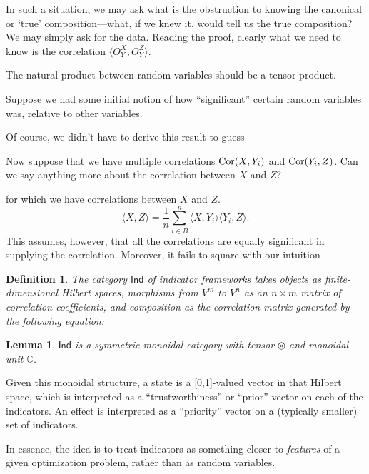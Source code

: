 \documentclass{sig-alternate-05-2015}
\theoremstyle{plain}
\newtheorem{lem}[thm]{Lemma}
\theoremstyle{plain}
\newtheorem{define}{Definition}
\theoremstyle{remark}
\newcommand{\Cat}[1]{\mathsf{#1}}
\def\Ind{\Cat{Ind}}
\def\Cor{\textnormal{Cor}}
\begin{document}
In such a situation, we may ask what is the obstruction to knowing the canonical or `true' composition---what, if we knew it, would tell us the true composition? We may simply ask for the data. Reading the proof, clearly what we need to know is the correlation $\langle O_Y^X, O_Y^Z \rangle$.

The natural product between random variables should be a tensor product.

Suppose we had some initial notion of how ``significant'' certain random variables was, relative to other variables.


Of course, we didn't have to derive this result to guess 

Now suppose that we have multiple correlations $\Cor(X,Y_i)$ and $\Cor(Y_i,Z)$. Can we say anything more about the correlation between $X$ and $Z$?

 for which we have correlations between $X$ and $Z$.
\[ \langle X , Z \rangle = \frac{1}{n} \sum_{i \in B}^n \langle X,Y_i \rangle \langle Y_i, Z \rangle.\] 
This assumes, however, that all the correlations are equally significant in supplying the correlation. Moreover, it fails to square with our intuition

\begin{define}The category $\Ind$ of indicator frameworks takes objects as finite-dimensional Hilbert spaces, morphisms from $V^m$ to $V^n$ as an $n \times m$ matrix of correlation coefficients, and composition as the correlation matrix generated by the following equation: 

\end{define}

\begin{lem}$\Ind$ is a symmetric monoidal category with tensor $\otimes$ and monoidal unit $\mathbb{C}$.
\end{lem}

Given this monoidal structure, a state is a [0,1]-valued vector in that Hilbert space, which is interpreted as a ``trustworthiness'' or ``prior'' vector on each of the indicators. An effect is interpreted as a ``priority'' vector on a (typically smaller) set of indicators.

In essence, the idea is to treat indicators as something closer to \emph{features} of a given optimization problem, rather than as random variables.


\end{document}
